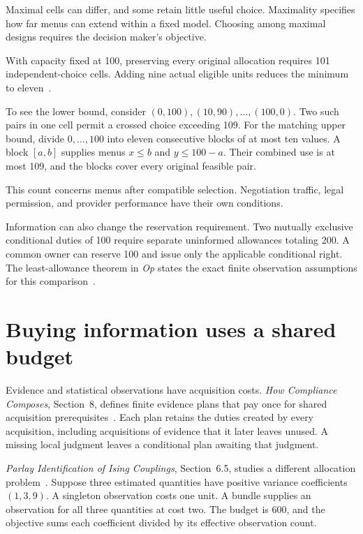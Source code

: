 \documentclass{momentum}
\begin{document}
Maximal cells can differ, and some retain little useful choice. Maximality specifies how far menus can extend within a fixed model.
Choosing among maximal designs requires the decision maker's objective.

With capacity fixed at 100, preserving every original allocation requires 101 independent-choice cells.
Adding nine actual eligible units reduces the minimum to eleven~\cite[Section~7.3]{op}.

To see the lower bound, consider $(0,100),(10,90),\ldots,(100,0)$.
Two such pairs in one cell permit a crossed choice exceeding 109.
For the matching upper bound, divide $0,\ldots,100$ into eleven consecutive blocks of at most ten values.
A block $[a,b]$ supplies menus $x\le b$ and $y\le100-a$.
Their combined use is at most 109, and the blocks cover every original feasible pair.

This count concerns menus after compatible selection.
Negotiation traffic, legal permission, and provider performance have their own conditions.

Information can also change the reservation requirement.
Two mutually exclusive conditional duties of 100 require separate uninformed allowances totaling 200.
A common owner can reserve 100 and issue only the applicable conditional right.
The least-allowance theorem in \emph{Op} states the exact finite observation assumptions for this comparison~\cite[Section~7]{op}.

\section{Buying information uses a shared budget}
\label{sec:acquisition}

Evidence and statistical observations have acquisition costs.
\emph{How Compliance Composes}, Section~8, defines finite evidence plans that pay once for shared acquisition prerequisites~\cite{compliance}.
Each plan retains the duties created by every acquisition, including acquisitions of evidence that it later leaves unused.
A missing local judgment leaves a conditional plan awaiting that judgment.

\emph{Parlay Identification of Ising Couplings}, Section~6.5, studies a different allocation problem~\cite{parlay}.
Suppose three estimated quantities have positive variance coefficients $(1,3,9)$.
A singleton observation costs one unit.
A bundle supplies an observation for all three quantities at cost two.
The budget is 600, and the objective sums each coefficient divided by its effective observation count.
\end{document}
